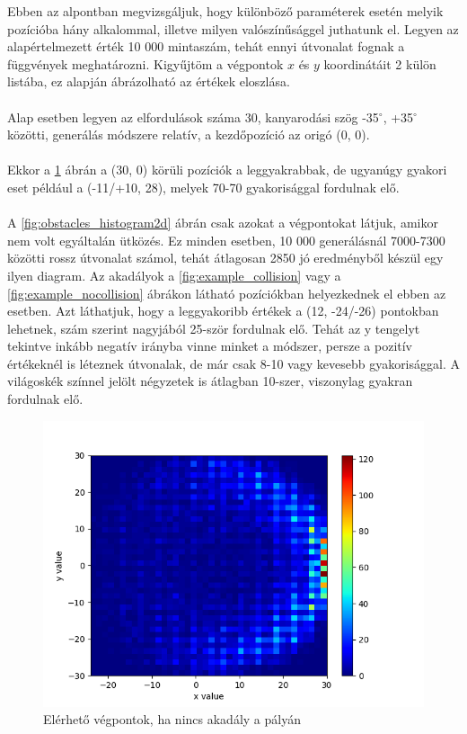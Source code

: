 Ebben az alpontban megvizsgáljuk, hogy különböző paraméterek esetén melyik pozícióba hány alkalommal, illetve milyen valószínűsággel juthatunk el. Legyen az alapértelmezett érték 10 000 mintaszám, tehát ennyi útvonalat fognak a függvények meghatározni. Kigyűjtöm a végpontok $ x $ és $ y $ koordinátáit 2 külön listába, ez alapján ábrázolható az értékek eloszlása.\\\\
Alap esetben legyen az elfordulások száma 30, kanyarodási szög -35$^{\circ}$, +35$^{\circ}$ közötti, generálás módszere relatív, a kezdőpozíció az origó (0, 0).\\\\
Ekkor a \ref{fig:no_obstacles_histogram2d} ábrán a (30, 0) körüli pozíciók a leggyakrabbak, de ugyanúgy gyakori eset például a (-11/+10, 28), melyek 70-70 gyakorisággal fordulnak elő.\\\\
A \ref{fig:obstacles_histogram2d} ábrán csak azokat a végpontokat látjuk, amikor nem volt egyáltalán ütközés. Ez minden esetben, 10 000 generálásnál 7000-7300 közötti rossz útvonalat számol, tehát átlagosan 2850 jó eredményből készül egy ilyen diagram. Az akadályok a \ref{fig:example_collision} vagy a \ref{fig:example_nocollision} ábrákon látható pozíciókban helyezkednek el ebben az esetben. Azt láthatjuk, hogy a leggyakoribb értékek a (12, -24/-26) pontokban lehetnek, szám szerint nagyjából 25-ször fordulnak elő. Tehát az y tengelyt tekintve inkább negatív irányba vinne minket a módszer, persze a pozitív értékeknél is léteznek útvonalak, de már csak 8-10 vagy kevesebb gyakorisággal. A világoskék színnel jelölt négyzetek is átlagban 10-szer, viszonylag gyakran fordulnak elő.



\begin{figure}[h!]
\centering
\includegraphics[scale=0.75]{images/no_obstacles_histogram2d.png}
\caption{Elérhető végpontok, ha nincs akadály a pályán}
\label{fig:no_obstacles_histogram2d}
\end{figure}

